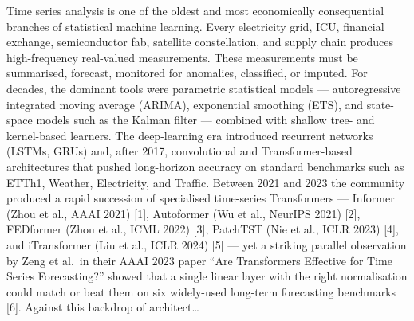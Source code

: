 Time series analysis is one of the oldest and most economically consequential branches of statistical machine learning. Every electricity grid, ICU, financial exchange, semiconductor fab, satellite constellation, and supply chain produces high-frequency real-valued measurements. These measurements must be summarised, forecast, monitored for anomalies, classified, or imputed. For decades, the dominant tools were parametric statistical models --- autoregressive integrated moving average (ARIMA), exponential smoothing (ETS), and state-space models such as the Kalman filter --- combined with shallow tree- and kernel-based learners. The deep-learning era introduced recurrent networks (LSTMs, GRUs) and, after 2017, convolutional and Transformer-based architectures that pushed long-horizon accuracy on standard benchmarks such as ETTh1, Weather, Electricity, and Traffic. Between 2021 and 2023 the community produced a rapid succession of specialised time-series Transformers --- Informer (Zhou et al., AAAI 2021) {[}1{]}, Autoformer (Wu et al., NeurIPS 2021) {[}2{]}, FEDformer (Zhou et al., ICML 2022) {[}3{]}, PatchTST (Nie et al., ICLR 2023) {[}4{]}, and iTransformer (Liu et al., ICLR 2024) {[}5{]} --- yet a striking parallel observation by Zeng et al.~in their AAAI 2023 paper ``Are Transformers Effective for Time Series Forecasting?'' showed that a single linear layer with the right normalisation could match or beat them on six widely-used long-term forecasting benchmarks {[}6{]}. Against this backdrop of architect\ldots{}
